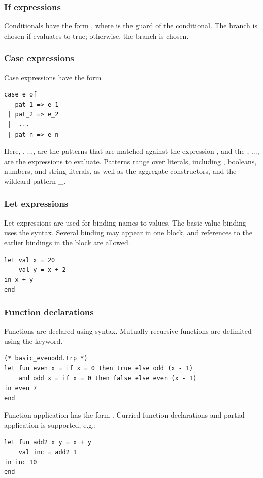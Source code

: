 \subsubsection{If expressions}
Conditionals have the form , where  is the guard of the conditional.
The branch  is chosen if  evaluates to true; otherwise, the branch  is chosen.


\subsubsection{Case expressions}
Case expressions have the form
\begin{lstlisting}
case e of
   pat_1 => e_1
 | pat_2 => e_2
 |  ...
 | pat_n => e_n
\end{lstlisting}
Here, , ...,  are the patterns that are matched against the expression , and the , ...,  are the
expressions to evaluate. Patterns range over literals, including \textcode{()}, booleans, numbers, and string literals, as well as the
aggregate constructors, and the wildcard pattern \_.


\subsubsection{Let expressions}
Let expressions are used for binding names to values. The basic value binding uses the  syntax.
Several binding may appear in one block, and references to the earlier bindings in the block are allowed.
\begin{lstlisting}
let val x = 20
    val y = x + 2
in x + y
end
\end{lstlisting}


\subsubsection{Function declarations}
\label{sec:letfun}
Functions are declared using  syntax. Mutually recursive functions
are delimited using the  keyword.
\begin{lstlisting}
(* basic_evenodd.trp *)
let fun even x = if x = 0 then true else odd (x - 1)
    and odd x = if x = 0 then false else even (x - 1)
in even 7
end
\end{lstlisting}

Function application has the form . Curried function declarations and partial
application is supported, e.g.:
\begin{lstlisting}
let fun add2 x y = x + y
    val inc = add2 1
in inc 10
end
\end{lstlisting}


